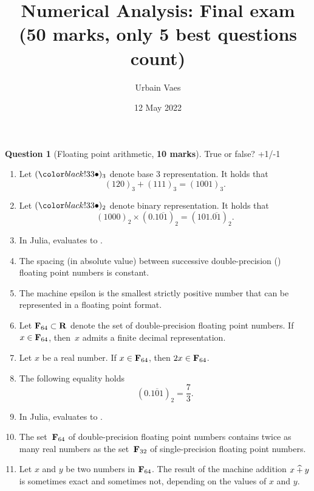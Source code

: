 \documentclass[11pt]{article}
\theoremstyle{definition}
\newtheorem{question}{Question}
\begin{document}
\title{Numerical Analysis: Final exam \\
\small{(\textbf{50 marks}, only 5 best questions count)}}
\author{Urbain Vaes}
\date{12 May 2022}
\maketitle

\begin{question}
    [Floating point arithmetic, \textbf{10 marks}]
    True or false? +1/-1
    \begin{enumerate}
        \item
            Let $(\placeholder)_3$ denote base 3 representation.
            It holds that
            \[
                (120)_3 + (111)_3 = (1001)_3.
            \]
        \item
            Let $(\placeholder)_2$ denote binary representation.
            It holds that
            \[
                (1000)_2 \times (0.1\overline{01})_2 = (101.\overline{01})_2.
            \]

        \item In Julia,  evaluates to .

        \item The spacing (in absolute value) between successive double-precision () floating point numbers is constant.

        \item
            The machine epsilon is the smallest strictly positive number that can be represented in a floating point format.

        \item
            Let $\mathbf F_{64} \subset \mathbf R$ denote the set of double-precision floating point numbers.
            If $x \in \mathbf F_{64}$, then~$x$ admits a finite decimal representation.

        \item
            Let $x$ be a real number. If $x \in \mathbf F_{64}$, then $2x \in \mathbf F_{64}$.

        \item
            The following equality holds
            \[
                (0.\overline{101})_2 = \frac{7}{3}.
            \]

        \item
            In Julia,  evaluates to .

        \item
            The set~$\mathbf F_{64}$ of double-precision floating point numbers contains twice as many real numbers
            as the set~$\mathbf F_{32}$ of single-precision floating point numbers.

        \item
            Let $x$ and $y$ be two numbers in $\mathbf F_{64}$.
            The result of the machine addition $x \mathbin{\widehat +} y$ is sometimes exact and sometimes not,
            depending on the values of $x$ and $y$.
    \end{enumerate}
\end{question}
\end{document}
